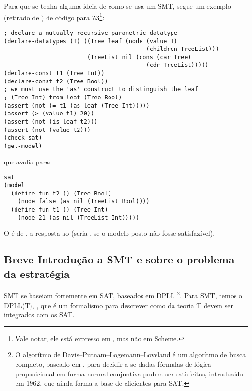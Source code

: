 \documentclass{article}
\begin{document}
Para que se tenha alguma ideia de como se usa um  SMT,
segue um exemplo (retirado de \cite{tuto}) de código para
Z3\footnote{Vale notar, ele está expresso em , mas
  não em Scheme.}:

\begin{lstlisting}
; declare a mutually recursive parametric datatype
(declare-datatypes (T) ((Tree leaf (node (value T)
                                         (children TreeList)))
                        (TreeList nil (cons (car Tree)
                                         (cdr TreeList)))))
(declare-const t1 (Tree Int))
(declare-const t2 (Tree Bool))
; we must use the 'as' construct to distinguish the leaf
; (Tree Int) from leaf (Tree Bool)
(assert (not (= t1 (as leaf (Tree Int)))))
(assert (> (value t1) 20))
(assert (not (is-leaf t2)))
(assert (not (value t2)))
(check-sat)
(get-model)
\end{lstlisting}

\noindent que avalia para:

\begin{lstlisting}
sat
(model
  (define-fun t2 () (Tree Bool)
    (node false (as nil (TreeList Bool))))
  (define-fun t1 () (Tree Int)
    (node 21 (as nil (TreeList Int)))))
\end{lstlisting}

O  é de , a resposta ao
 (seria , se o modelo posto não
fosse satisfazível).

\subsection{Breve Introdução a SMT e sobre o problema da estratégia}

 SMT se baseiam fortemente em  SAT,
baseados em DPLL \footnote{O algorítmo de
  Davis–Putnam–Logemann–Loveland é um algorítmo de busca completo,
  baseado em , para decidir a se dadas fórmulas
  de lógica proposicional em forma normal conjuntiva podem ser
  satisfeitas, introduzido em 1962, que ainda forma a base de
   eficientes para SAT.}. Para SMT, temos o DPLL(T),
, que é um formalismo para descrever como  da teoria
T devem ser integrados com os  SAT.
\end{document}
